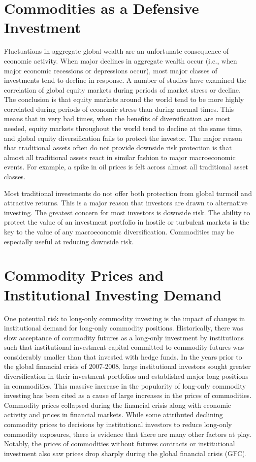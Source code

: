\documentclass[11pt]{article}
\begin{document}
\section*{Commodities as a Defensive Investment}
Fluctuations in aggregate global wealth are an unfortunate consequence of economic activity. When major declines in aggregate wealth occur (i.e., when major economic recessions or depressions occur), most major classes of investments tend to decline in response. A number of studies have examined the correlation of global equity markets during periods of market stress or decline. The conclusion is that equity markets around the world tend to be more highly correlated during periods of economic stress than during normal times. This means that in very bad times, when the benefits of diversification are most needed, equity markets throughout the world tend to decline at the same time, and global equity diversification fails to protect the investor. The major reason that traditional assets often do not provide downside risk protection is that almost all traditional assets react in similar fashion to major macroeconomic events. For example, a spike in oil prices is felt across almost all traditional asset classes.

Most traditional investments do not offer both protection from global turmoil and attractive returns. This is a major reason that investors are drawn to alternative investing. The greatest concern for most investors is downside risk. The ability to protect the value of an investment portfolio in hostile or turbulent markets is the key to the value of any macroeconomic diversification. Commodities may be especially useful at reducing downside risk.

\section*{Commodity Prices and Institutional Investing Demand}
One potential risk to long-only commodity investing is the impact of changes in institutional demand for long-only commodity positions. Historically, there was slow acceptance of commodity futures as a long-only investment by institutions such that institutional investment capital committed to commodity futures was considerably smaller than that invested with hedge funds. In the years prior to the global financial crisis of 2007-2008, large institutional investors sought greater diversification in their investment portfolios and established major long positions in commodities. This massive increase in the popularity of long-only commodity investing has been cited as a cause of large increases in the prices of commodities. Commodity prices collapsed during the financial crisis along with economic activity and prices in financial markets. While some attributed declining commodity prices to decisions by institutional investors to reduce long-only commodity exposures, there is evidence that there are many other factors at play. Notably, the prices of commodities without futures contracts or institutional investment also saw prices drop sharply during the global financial crisis (GFC).
\end{document}
